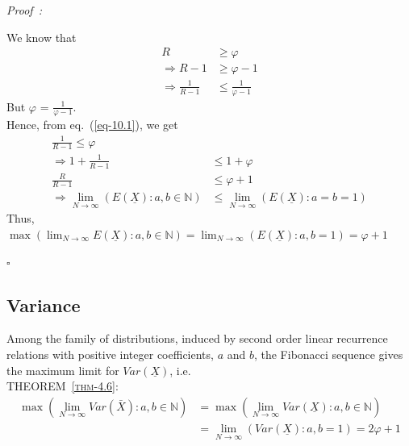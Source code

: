 \begin{multicols}{2}
\vspace{-1cm}

{\it Proof~:}

We know that 
\begin{align}
 R &\geq \varphi\nonumber\\
 \Rightarrow R-1 &\geq \varphi -1 \nonumber\\
\Rightarrow \frac{1}{R-1} &\leq \frac{1}{\varphi-1}\label{eq-10.1}
 \end{align}
 But $\varphi$ = $\displaystyle{\frac{1}{\varphi-1}}$. \\Hence, from eq.~(\ref{eq-10.1}), we get
{\fontsize{8}{9}\selectfont\begin{align}
\frac{1}{R-1} \leq \varphi\nonumber\\
\Rightarrow 1 + \frac{1}{R-1} &\leq 1+\varphi\label{eq-10.2}\\
\displaystyle{\frac{R}{R-1}} &\leq \varphi + 1 \nonumber\\
\Rightarrow \lim_{N\rightarrow \infty}\left(E(\underline{X}):a,b\in \mathbb N\right) &\leq \lim_{N\rightarrow \infty}\left(E(\underline{X}): a = b = 1\right)\label{eq-10.3}
\end{align}}
Thus, \\
$\max{\left(\displaystyle{\lim_{N\rightarrow \infty}} E(\underline{X}): a, b \in \mathbb N\right)} = \displaystyle{\lim_{N \rightarrow \infty}}\left(E(\underline{X}) : a,b = 1\right) = \varphi + 1$

\vspace{-.3cm}

\hfill{$\square$}

\vspace{-.3cm}

\subsection{Variance}\label{subsection-10.2}

Among the family of distributions, induced by second order linear recurrence relations with positive integer coefficients, $a$ and $b$, the Fibonacci sequence gives the maximum limit for $Var(\underline{X})$, i.e.\\
\textsc{THEOREM~{\ref{thm-4.6}}:}
{\fontsize{7}{8}\selectfont\begin{align}
\max{\left(\lim_{N\rightarrow \infty} Var(\bar{X}): a,b \in \mathbb N\right)}&= \max{\left(\lim_{N\rightarrow \infty}Var(\underline{X}): a,b \in \mathbb N\right)}\label{eq-10.4}\\
 &= \lim_{N \rightarrow \infty}\left(Var(\underline{X}):a,b=1\right) = 2\varphi + 1\label{eq-10.5}
\end{align}}


\end{multicols}
